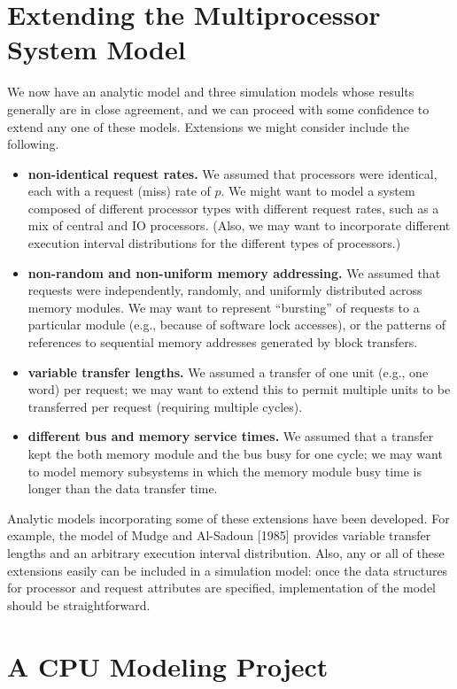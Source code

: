 \section{Extending the Multiprocessor System Model}

We now have an analytic model and three simulation models whose
results generally are in close agreement, and we can proceed with some
confidence to extend any one of these models. Extensions we might consider
include the following.
\begin{itemize}
\item \textbf{non-identical request rates.} We assumed that processors
were identical, each with a request (miss) rate of $p$. We
might want to model a system composed of different
processor types with different request rates, such as a mix of
central and IO processors. (Also, we may want to incorporate
different execution interval distributions for the different
types of processors.)
\item \textbf{non-random and non-uniform memory addressing.} We
assumed that requests were independently, randomly, and
\noindent uniformly distributed across memory modules. We may want
to represent ``bursting'' of requests to a particular module
(e.g., because of software lock accesses), or the patterns of
references to sequential memory addresses generated by block
transfers.
\item \textbf{variable transfer lengths.} We assumed a transfer of one
unit (e.g., one word) per request; we may want to extend this
to permit multiple units to be transferred per request (requiring multiple cycles).
\item \textbf{different bus and memory service times.} We assumed that
a transfer kept the both memory module and the bus busy for
one cycle; we may want to model memory subsystems in
which the memory module busy time is longer than the data
transfer time.
\end{itemize}

Analytic models incorporating some of these extensions have been developed.
For example, the model of Mudge and Al-Sadoun [1985] provides
variable transfer lengths and an arbitrary execution interval distribution.
Also, any or all of these extensions easily can be included in a simulation
model: once the data structures for processor and request attributes are
specified, implementation of the model should be straightforward.

\section{A CPU Modeling Project}

